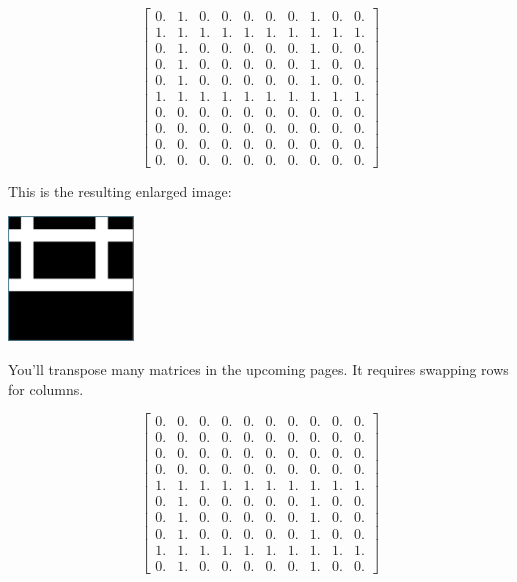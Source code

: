 $$\begin{bmatrix}
0. & 1. & 0. & 0. & 0. & 0. & 0. & 1. & 0. & 0.\\
1. & 1. & 1. & 1. & 1. & 1. & 1. & 1. & 1. & 1.\\
0. & 1. & 0. & 0. & 0. & 0. & 0. & 1. & 0. & 0.\\
0. & 1. & 0. & 0. & 0. & 0. & 0. & 1. & 0. & 0.\\
0. & 1. & 0. & 0. & 0. & 0. & 0. & 1. & 0. & 0.\\
1. & 1. & 1. & 1. & 1. & 1. & 1. & 1. & 1. & 1.\\
0. & 0. & 0. & 0. & 0. & 0. & 0. & 0. & 0. & 0.\\
0. & 0. & 0. & 0. & 0. & 0. & 0. & 0. & 0. & 0.\\
0. & 0. & 0. & 0. & 0. & 0. & 0. & 0. & 0. & 0.\\
0. & 0. & 0. & 0. & 0. & 0. & 0. & 0. & 0. & 0.
\end{bmatrix}$$

This is the resulting enlarged image:

\includegraphics[width=0.25\textwidth]{rotate90.png}

You'll transpose many matrices in the upcoming pages. It requires swapping 
rows for columns. 

$$\begin{bmatrix}
0. & 0. & 0. & 0. & 0. & 0. & 0. & 0. & 0. & 0.\\
0. & 0. & 0. & 0. & 0. & 0. & 0. & 0. & 0. & 0.\\
0. & 0. & 0. & 0. & 0. & 0. & 0. & 0. & 0. & 0.\\
0. & 0. & 0. & 0. & 0. & 0. & 0. & 0. & 0. & 0.\\
1. & 1. & 1. & 1. & 1. & 1. & 1. & 1. & 1. & 1.\\
0. & 1. & 0. & 0. & 0. & 0. & 0. & 1. & 0. & 0.\\
0. & 1. & 0. & 0. & 0. & 0. & 0. & 1. & 0. & 0.\\
0. & 1. & 0. & 0. & 0. & 0. & 0. & 1. & 0. & 0.\\
1. & 1. & 1. & 1. & 1. & 1. & 1. & 1. & 1. & 1.\\
0. & 1. & 0. & 0. & 0. & 0. & 0. & 1. & 0. & 0.
\end{bmatrix}$$

